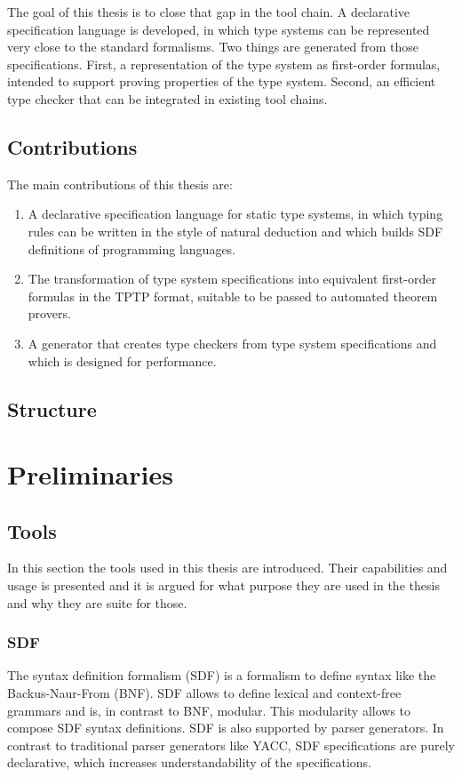 \documentclass[a4paper,twoside]{report}
\begin{document}
The goal of this thesis is to close that gap in the tool chain. A
declarative specification language is developed, in which type systems
can be represented very close to the standard formalisms. Two things
are generated from those specifications. First, a representation of
the type system as first-order formulas, intended to support proving
properties of the type system. Second, an efficient type checker that
can be integrated in existing tool chains.
\section{Contributions}
The main contributions of this thesis are:
\begin{enumerate}
\item A declarative specification language for static type systems, in
  which typing rules can be written in the style of natural deduction
  and which builds SDF definitions of programming languages.
\item The transformation of type system specifications into equivalent
  first-order formulas in the TPTP format, suitable to be passed to
  automated theorem provers.
\item A generator that creates type checkers from type system
  specifications and which is designed for performance.
\end{enumerate}

\section{Structure}

\chapter{Preliminaries}
\section{Tools}
In this section the tools used in this thesis are introduced. Their
capabilities and usage is presented and it is argued for what purpose
they are used in the thesis and why they are suite for those.
\subsection{SDF}
The syntax definition formalism (SDF) is a formalism to define syntax
like the Backus-Naur-From (BNF). SDF allows to define lexical and
context-free grammars and is, in contrast to BNF, modular. This
modularity allows to compose SDF syntax definitions. SDF is also
supported by parser generators. In contrast to traditional parser
generators like YACC, SDF specifications are purely declarative, which
increases understandability of the specifications.
\end{document}
